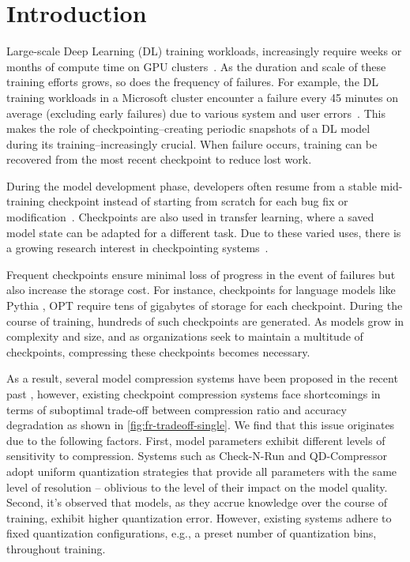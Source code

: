 \section{Introduction}
\label{sec:introduction}









Large-scale Deep Learning (DL) training workloads, increasingly require weeks or months of compute time on GPU clusters~\cite{opt2}. As the duration and scale of these training efforts grows, so does the frequency of failures. For example, the DL training workloads in a Microsoft cluster encounter a failure every 45 minutes on average (excluding early failures) due to various system and user errors~\cite{philly}. This makes the role of checkpointing--creating periodic snapshots of a DL model during its training--increasingly crucial. When failure occurs, training can be recovered from the most recent checkpoint to reduce lost work.

During the model development phase, developers often resume from a stable mid-training checkpoint instead of starting from scratch for each bug fix or modification~\cite{opt-logbook}. Checkpoints are also used in transfer learning, where a saved model state can be adapted for a different task. Due to these varied uses, there is a growing research interest in checkpointing systems~\cite{QD, lcCompression, checknrun, deltadnn}.




Frequent checkpoints ensure minimal loss of progress in the event of failures but also increase the storage cost. For instance, checkpoints for language models like Pythia \cite{pythia}, OPT \cite{opt2} require tens of gigabytes of storage for each checkpoint. During the course of training, hundreds of such checkpoints are generated. As models grow in complexity and size, and as organizations seek to maintain a multitude of checkpoints, compressing these checkpoints becomes necessary. 





As a result, several model compression systems have been proposed in the recent past \cite{QD,lcCompression,checknrun,deltadnn}, however, existing checkpoint compression systems face shortcomings in terms of suboptimal trade-off between compression ratio and accuracy degradation as shown in \cref{fig:fr-tradeoff-single}. We find that this issue originates due to the following factors. First, model parameters exhibit different levels of sensitivity to compression. Systems such as Check-N-Run \cite{checknrun} and QD-Compressor \cite{QD} adopt uniform quantization strategies that provide all parameters with the same level of resolution -- oblivious to the level of their impact on the model quality. 
Second, it's observed that models, as they accrue knowledge over the course of training, exhibit higher quantization error. However, existing systems adhere to fixed quantization configurations, e.g., a preset number of quantization bins, throughout training.




